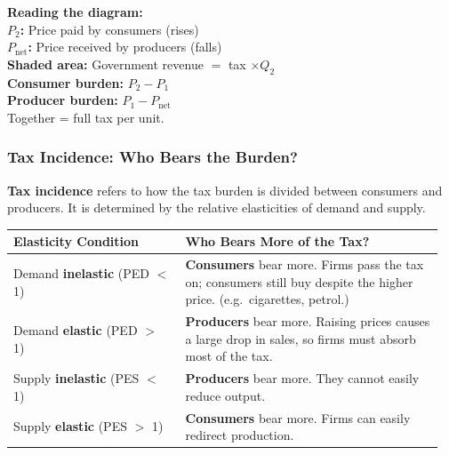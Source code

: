 \documentclass[11pt, a4paper, twoside]{book}
\begin{document}
\begin{diagrambox}
{%
}{%
\textbf{\color{CurveNavy}Reading the diagram:}\\[4pt]
\textbf{$P_2$:} Price paid by consumers (rises)\\[2pt]
\textbf{$P_{\text{net}}$:} Price received by producers (falls)\\[2pt]
\textbf{Shaded area:} Government revenue $=$ tax $\times Q_2$\\[6pt]
\textbf{\color{CurveRose}Consumer burden:} $P_2 - P_1$\\[2pt]
\textbf{\color{CurveRose}Producer burden:} $P_1 - P_{\text{net}}$\\[2pt]
Together = full tax per unit.%
}
\end{diagrambox}

\subsubsection{Tax Incidence: Who Bears the Burden?}

\textbf{Tax incidence} refers to how the tax burden is divided between consumers and producers. It is determined by the relative elasticities of demand and supply.

\begin{tcolorbox}[enhanced,colback=LightBlue,colframe=MidBlue!70,arc=0pt,boxrule=0.8pt]
\begin{tabular}{@{}>{\RaggedRight\arraybackslash}p{0.38\linewidth}>{\RaggedRight\arraybackslash}p{0.58\linewidth}@{}}
\textbf{\color{NavyPrimary}Elasticity Condition} & \textbf{\color{NavyPrimary}Who Bears More of the Tax?} \\
\midrule
Demand \textbf{inelastic} (PED $<$ 1) & \textbf{Consumers} bear more. Firms pass the tax on; consumers still buy despite the higher price. (e.g.\ cigarettes, petrol.) \\
Demand \textbf{elastic} (PED $>$ 1) & \textbf{Producers} bear more. Raising prices causes a large drop in sales, so firms must absorb most of the tax. \\
Supply \textbf{inelastic} (PES $<$ 1) & \textbf{Producers} bear more. They cannot easily reduce output. \\
Supply \textbf{elastic} (PES $>$ 1) & \textbf{Consumers} bear more. Firms can easily redirect production. \\
\end{tabular}
\end{tcolorbox}
\end{document}
